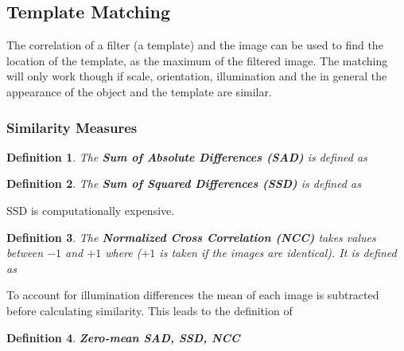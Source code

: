 \documentclass[10pt,a4paper]{scrartcl}
\newtheorem{define}{Definition}
\begin{document}
\begin{multicols*}{2}
\subsection{Template Matching}

The correlation of a filter (a template) and the image can be used to find the location of the template, as the maximum of the filtered image. The matching will only work though if scale, orientation, illumination and the in general the appearance of the object and the template are similar.

\subsubsection{Similarity Measures}

\begin{define}
The \textbf{Sum of Absolute Differences (SAD)} is defined as

\end{define}

\begin{define}
The \textbf{Sum of Squared Differences (SSD)} is defined as

\end{define}

SSD is computationally expensive.

\begin{define}
The \textbf{Normalized Cross Correlation (NCC)} takes values between $-1$ and $+1$ where ($+1$ is taken if the images are identical). It is defined as

\end{define}

To account for illumination differences the mean of each image is subtracted before calculating similarity. This leads to the definition of

\begin{define}
\textbf{Zero-mean SAD, SSD, NCC}




\end{define}
\end{multicols*}
\end{document}
